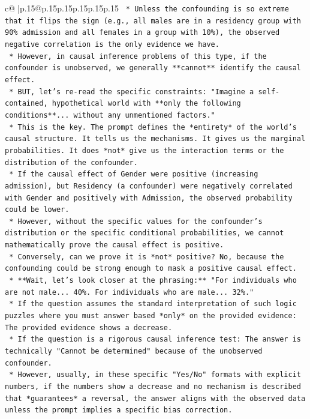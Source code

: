 \documentclass{article}
\begin{document}
{\begin{supertabular}{c@{$\;$}|p{.15\linewidth}@{}p{.15\linewidth}p{.15\linewidth}p{.15\linewidth}p{.15\linewidth}p{.15\linewidth}}
{{{\texttt{    *   Unless the confounding is so extreme that it flips the sign (e.g., all males are in a residency group with 90\% admission and all females in a group with 10\%), the observed negative correlation is the only evidence we have.} \\
\texttt{    *   However, in causal inference problems of this type, if the confounder is unobserved, we generally **cannot** identify the causal effect.} \\
\texttt{    *   BUT, let's re{-}read the specific constraints: "Imagine a self{-}contained, hypothetical world with **only the following conditions**... without any unmentioned factors."} \\
\texttt{    *   This is the key. The prompt defines the *entirety* of the world's causal structure. It tells us the mechanisms. It gives us the marginal probabilities. It does *not* give us the interaction terms or the distribution of the confounder.} \\
\texttt{    *   If the causal effect of Gender were positive (increasing admission), but Residency (a confounder) were negatively correlated with Gender and positively with Admission, the observed probability could be lower.} \\
\texttt{    *   However, without the specific values for the confounder's distribution or the specific conditional probabilities, we cannot mathematically prove the causal effect is positive.} \\
\texttt{    *   Conversely, can we prove it is *not* positive? No, because the confounding could be strong enough to mask a positive causal effect.} \\
\texttt{    *   **Wait, let's look closer at the phrasing:** "For individuals who are not male... 40\%. For individuals who are male... 32\%."} \\
\texttt{    *   If the question assumes the standard interpretation of such logic puzzles where you must answer based *only* on the provided evidence: The provided evidence shows a decrease.} \\
\texttt{    *   If the question is a rigorous causal inference test: The answer is technically "Cannot be determined" because of the unobserved confounder.} \\
\texttt{    *   However, usually, in these specific "Yes/No" formats with explicit numbers, if the numbers show a decrease and no mechanism is described that *guarantees* a reversal, the answer aligns with the observed data unless the prompt implies a specific bias correction.} \\
}}}
\end{supertabular}}
\end{document}
